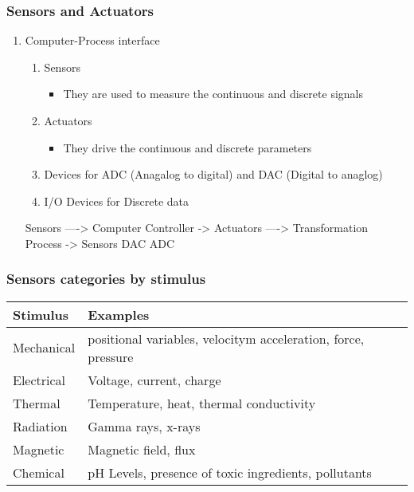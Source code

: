 \documentclass[11pt]{article}
\begin{document}
\subsubsection{Sensors and Actuators}
\label{sec:org93bcb24}
\begin{enumerate}
\item Computer-Process interface
\label{sec:org91c20cc}
\begin{enumerate}
\item Sensors
\begin{itemize}
\item They are used to measure the continuous and discrete signals
\end{itemize}
\item Actuators
\begin{itemize}
\item They drive the continuous and discrete parameters
\end{itemize}
\item Devices for ADC (Anagalog to digital) and DAC (Digital to anaglog)
\item I/O Devices for Discrete data
\end{enumerate}


Sensors ----> Computer Controller -> Actuators ----> Transformation Process -> Sensors
         DAC                                    ADC
\end{enumerate}

\subsubsection{Sensors categories by stimulus}
\label{sec:org4ca00e5}

\begin{center}
\begin{tabular}{ll}
Stimulus & Examples\\[0pt]
\hline
Mechanical & positional variables, velocitym acceleration, force, pressure\\[0pt]
Electrical & Voltage, current, charge\\[0pt]
Thermal & Temperature, heat, thermal conductivity\\[0pt]
Radiation & Gamma rays, x-rays\\[0pt]
Magnetic & Magnetic field, flux\\[0pt]
Chemical & pH Levels, presence of toxic ingredients, pollutants\\[0pt]
\end{tabular}
\end{center}
\end{document}
